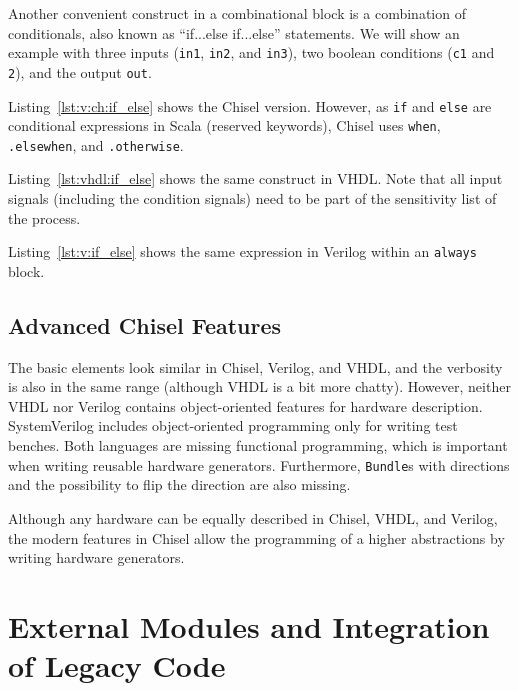 \documentclass[%
    10pt,
    headinclude, footinclude=false,
    openright, %
    notitlepage,
    cleardoublepage=empty,
    headsepline,
    numbers=noenddot,
    bibliography=totoc, index=totoc,
    ]{scrbook}
\newcommand{\code}[1]{{\lstinline[basicstyle=\small\ttfamily]{#1}}}
\begin{document}
Another convenient construct in a combinational block is a combination of
conditionals, also known as ``if...else if...else'' statements.
We will show an example with three inputs (\code{in1}, \code{in2}, and \code{in3}),
two boolean conditions (\code{c1} and \code{2}), and the output \code{out}.


Listing~\ref{lst:v:ch:if_else} shows the Chisel version. However, as \code{if} and
\code{else} are conditional expressions in Scala (reserved keywords), Chisel
uses \code{when}, \code{.elsewhen}, and \code{.otherwise}.


Listing~\ref{lst:vhdl:if_else} shows the same construct in VHDL. Note that all input
signals (including the condition signals) need to be part of the sensitivity list
of the process.


Listing~\ref{lst:v:if_else} shows the same expression in Verilog within an \code{always} block.



\subsection{Advanced Chisel Features}

The basic elements look similar in Chisel, Verilog, and VHDL, and the verbosity
is also in the same range (although VHDL is a bit more chatty).
However, neither VHDL nor Verilog contains object-oriented features for hardware
description. SystemVerilog includes object-oriented programming only for writing test benches.
Both languages are missing functional programming, which is important when
writing reusable hardware generators.
Furthermore, \code{Bundle}s with directions and the possibility to flip the direction
are also missing.

Although any hardware can be equally described in Chisel, VHDL, and Verilog,
the modern features in Chisel allow the programming of a higher abstractions by
writing hardware generators.

\section{External Modules and Integration of Legacy Code}
\end{document}
